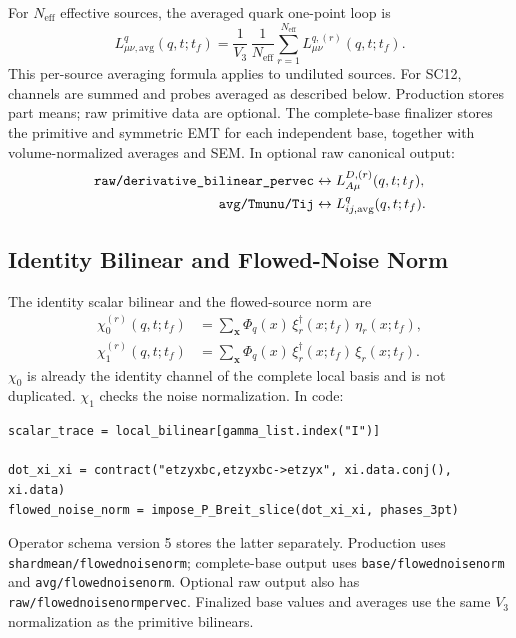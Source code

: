 \documentclass[11pt,a4paper]{article}
\newcommand{\code}[1]{\texttt{\begingroup\def\_{\textunderscore\allowbreak}#1\endgroup}}
\newcommand{\Vthree}{V_3}
\newcommand{\Tf}{t_f}
\begin{document}
For \(N_{\mathrm{eff}}\) effective sources, the averaged quark one-point loop is
\begin{equation}
  L^q_{\mu\nu,\mathrm{avg}}(q,t;\Tf)
  =
  \frac{1}{\Vthree}\,
  \frac{1}{N_{\mathrm{eff}}}
  \sum_{r=1}^{N_{\mathrm{eff}}}
  L^{q,(r)}_{\mu\nu}(q,t;\Tf).
  \label{eq:noise_volume_avg}
\end{equation}
This per-source averaging formula applies to undiluted sources. For SC12,
channels are summed and probes averaged as described below. Production stores
part means; raw primitive data are optional. The complete-base finalizer stores
the primitive and symmetric EMT for each independent base, together with
volume-normalized averages and SEM. In optional raw canonical output:
\begin{align}
  \code{raw/derivative\_bilinear\_pervec}
  &\leftrightarrow
  L^{D,(r)}_{A\mu}(q,t;\Tf),
  \\
  \code{avg/Tmunu/Tij}
  &\leftrightarrow
  L^q_{ij,\mathrm{avg}}(q,t;\Tf).
\end{align}

\subsection{Identity Bilinear and Flowed-Noise Norm}

The identity scalar bilinear and the flowed-source norm are
\begin{align}
  \chi_0^{(r)}(q,t;\Tf)
  &=
  \sum_{\mathbf{x}}\Phi_q(x)\,
  \xi_r^\dagger(x;\Tf)\,\eta_r(x;\Tf),
  \label{eq:chi0}
  \\
  \chi_1^{(r)}(q,t;\Tf)
  &=
  \sum_{\mathbf{x}}\Phi_q(x)\,
  \xi_r^\dagger(x;\Tf)\,\xi_r(x;\Tf).
  \label{eq:chi1}
\end{align}
\(\chi_0\) is already the identity channel of the complete local basis and is
not duplicated.  \(\chi_1\) checks the noise normalization.  In code:
\begin{verbatim}
scalar_trace = local_bilinear[gamma_list.index("I")]

dot_xi_xi = contract("etzyxbc,etzyxbc->etzyx", xi.data.conj(), xi.data)
flowed_noise_norm = impose_P_Breit_slice(dot_xi_xi, phases_3pt)
\end{verbatim}
Operator schema version 5 stores the latter separately. Production uses
\code{shard\_mean/flowed\_noise\_norm}; complete-base output uses
\code{base/flowed\_noise\_norm} and \code{avg/flowed\_noise\_norm}.
Optional raw output also has \code{raw/flowed\_noise\_norm\_pervec}.
Finalized base values and averages use the same \(\Vthree\) normalization
as the primitive bilinears.
\end{document}
